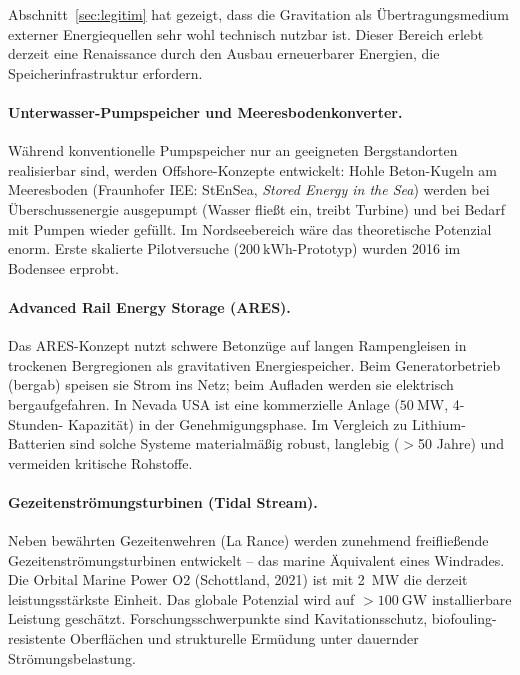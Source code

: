 ﻿\documentclass[12pt, a4paper]{report}
\theoremstyle{definition}
\theoremstyle{remark}
\begin{document}
Abschnitt~\ref{sec:legitim} hat gezeigt, dass die Gravitation als
Übertragungsmedium externer Energiequellen sehr wohl technisch nutzbar ist.
Dieser Bereich erlebt derzeit eine Renaissance durch den Ausbau erneuerbarer
Energien, die Speicherinfrastruktur erfordern.

\paragraph{Unterwasser-Pumpspeicher und Meeresbodenkonverter.}
Während konventionelle Pumpspeicher nur an geeigneten Bergstandorten realisierbar
sind, werden Offshore-Konzepte entwickelt: Hohle Beton-Kugeln am Meeresboden
(Fraunhofer IEE: StEnSea, \emph{Stored Energy in the Sea}) werden bei
Überschussenergie ausgepumpt (Wasser fließt ein, treibt Turbine) und bei Bedarf
mit Pumpen wieder gefüllt. Im Nordseebereich wäre das theoretische Potenzial
enorm. Erste skalierte Pilotversuche ($\SI{200}{\kilo\watt\hour}$-Prototyp) wurden
2016 im Bodensee erprobt.

\paragraph{Advanced Rail Energy Storage (ARES).}
Das ARES-Konzept nutzt schwere Betonzüge auf langen Rampengleisen in trockenen
Bergregionen als gravitativen Energiespeicher. Beim Generatorbetrieb (bergab)
speisen sie Strom ins Netz; beim Aufladen werden sie elektrisch bergaufgefahren.
In Nevada USA ist eine kommerzielle Anlage ($\SI{50}{\mega\watt}$, 4-Stunden-
Kapazität) in der Genehmigungsphase. Im Vergleich zu Lithium-Batterien sind
solche Systeme materialmäßig robust, langlebig ($>$50 Jahre) und vermeiden
kritische Rohstoffe.

\paragraph{Gezeitenströmungsturbinen (Tidal Stream).}
Neben bewährten Gezeitenwehren (La Rance) werden zunehmend freifließende
Gezeitenströmungsturbinen entwickelt -- das marine Äquivalent eines Windrades.
Die Orbital Marine Power O2 (Schottland, 2021) ist mit \SI{2}{\mega\watt}
die derzeit leistungsstärkste Einheit. Das globale Potenzial wird auf
$>\SI{100}{\giga\watt}$ installierbare Leistung geschätzt. Forschungsschwerpunkte
sind Kavitationsschutz, biofouling-resistente Oberflächen und strukturelle
Ermüdung unter dauernder Strömungsbelastung.
\end{document}
